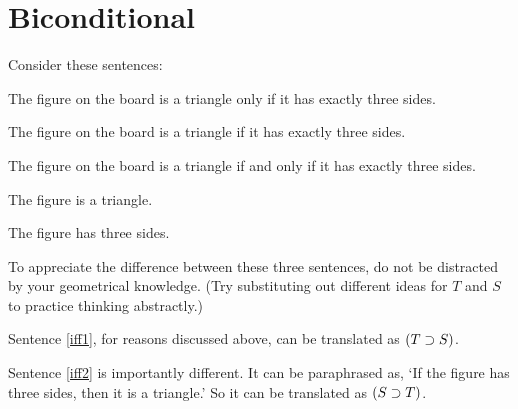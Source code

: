 
%
%
%

\section{Biconditional}
Consider these sentences:
\begin{earg}
\item[\ex{iff1}] The figure on the board is a triangle only if it has exactly three sides.
\item[\ex{iff2}] The figure on the board is a triangle if it has exactly three sides.
\item[\ex{iff3}] The figure on the board is a triangle if and only if it has exactly three sides.
\end{earg}

\begin{ekey}
\item[T:] The figure is a triangle.
\item[S:] The figure has three sides.
\end{ekey}

To appreciate the difference between these three sentences, do not be distracted by your geometrical knowledge. (Try substituting out different ideas for $T$ and $S$ to practice thinking abstractly.)

Sentence \ref{iff1}, for reasons discussed above, can be translated as $(T\supset S)$.

Sentence \ref{iff2} is importantly different. It can be paraphrased as, `If the figure has three sides, then it is a triangle.' So it can be translated as $(S\supset T)$.

